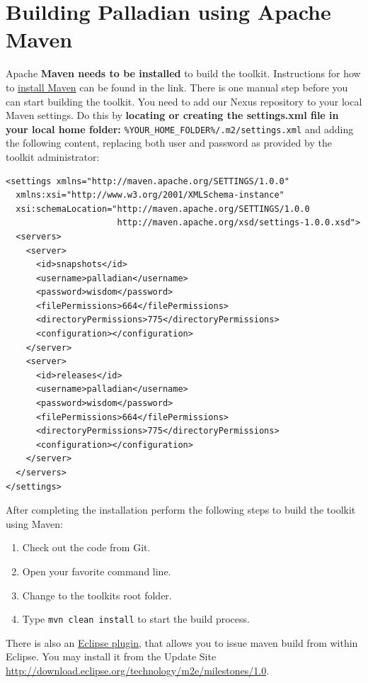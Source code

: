 \section{Building Palladian using Apache Maven}
\label{sec:buildingthetoolkitusingapachemaven}
Apache \textbf{Maven needs to be installed} to build the toolkit. Instructions for how to \href{http://maven.apache.org/download.html#Installation}{install Maven} can be found in the link. There is one manual step before you can start building the toolkit. You need to add our Nexus repository to your local Maven settings. Do this by \textbf{locating or creating the settings.xml file in your local home folder:} \texttt{\%YOUR\_HOME\_FOLDER\%/.m2/settings.xml} and adding the following content, replacing both user and password as provided by the toolkit administrator:
\begin{verbatim}
<settings xmlns="http://maven.apache.org/SETTINGS/1.0.0"
  xmlns:xsi="http://www.w3.org/2001/XMLSchema-instance"
  xsi:schemaLocation="http://maven.apache.org/SETTINGS/1.0.0
                      http://maven.apache.org/xsd/settings-1.0.0.xsd">
  <servers>
    <server>
      <id>snapshots</id>
      <username>palladian</username>
      <password>wisdom</password>
      <filePermissions>664</filePermissions>
      <directoryPermissions>775</directoryPermissions>
      <configuration></configuration>
    </server>
    <server>
      <id>releases</id>
      <username>palladian</username>
      <password>wisdom</password>
      <filePermissions>664</filePermissions>
      <directoryPermissions>775</directoryPermissions>
      <configuration></configuration>
    </server>
  </servers>
</settings>
\end{verbatim}
After completing the installation perform the following steps to build the toolkit using Maven:
\begin{enumerate}
\item Check out the code from Git.
\item Open your favorite command line.
\item Change to the toolkits root folder.
\item Type \texttt{mvn clean install} to start the build process.
\end{enumerate}
There is also an \href{http://www.eclipse.org/m2e/}{Eclipse plugin}, that allows you to issue maven build from within Eclipse. You may install it from the Update Site \url{http://download.eclipse.org/technology/m2e/milestones/1.0}.
